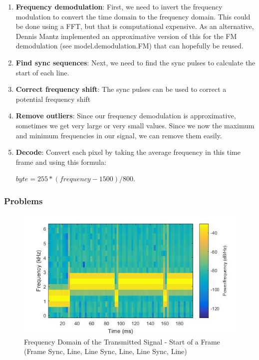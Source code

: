 \begin{enumerate}
	\item \textbf{Frequency demodulation}: First, we need to invert the frequency modulation to convert the time domain to the frequency domain. This could be done using a \ac{FFT}, but that is computational expensive. As an alternative, Dennis Mantz implemented an approximative version of this for the FM demodulation (see model.demodulation.FM) that can hopefully be reused. 
	\item \textbf{Find sync sequences}: Next, we need to find the sync pulses to calculate the start of each line. 
	\item \textbf{Correct frequency shift}: The sync pulses can be used to correct a potential frequency shift
	\item \textbf{Remove outliers}: Since our frequency demodulation is approximative, sometimes we get very large or very small values. Since we now the maximum and minimum frequencies in our signal, we can remove them easily. 
	\item \textbf{Decode}: Convert each pixel by taking the average frequency in this time frame and using this formula: 
	
	$byte = 255*(frequency-1500)/800$. 
\end{enumerate}


\subsubsection{Problems}

\begin{figure}[!htbp]
	\centering
	\includegraphics[width=1.0\linewidth]{gfx/sstv_nice.jpg}
	\caption{Frequency Domain of the Transmitted Signal - Start of a Frame (Frame Sync, Line, Line Sync, Line, Line Sync, Line)}
	\label{fig:impl:sstv:spectro_tx}
\end{figure}


